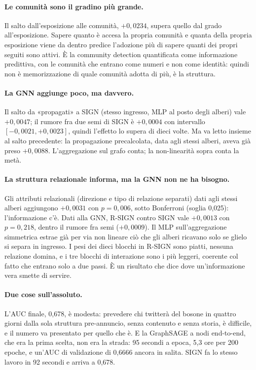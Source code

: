 \documentclass[11pt,a4paper]{article}
\begin{document}
\paragraph{Le comunità sono il gradino più grande.} Il salto dall'esposizione alle comunità, $+0{,}0234$, supera quello dal grado all'esposizione. Sapere quanto è accesa la propria comunità e quanta della propria esposizione viene da dentro predice l'adozione più di sapere quanti dei propri seguiti sono attivi. È la community detection quantificata come informazione predittiva, con le comunità che entrano come numeri e non come identità: quindi non è memorizzazione di quale comunità adotta di più, è la struttura.

\paragraph{La GNN aggiunge poco, ma davvero.} Il salto da «propagati» a SIGN (stesso ingresso, MLP al posto degli alberi) vale $+0{,}0047$; il rumore fra due semi di SIGN è $+0{,}0004$ con intervallo $[-0{,}0021, +0{,}0023]$, quindi l'effetto lo supera di dieci volte. Ma va letto insieme al salto precedente: la propagazione precalcolata, data agli stessi alberi, aveva già preso $+0{,}0088$. L'aggregazione sul grafo conta; la non-linearità sopra conta la metà.

\paragraph{La struttura relazionale informa, ma la GNN non ne ha bisogno.} Gli attributi relazionali (direzione e tipo di relazione separati) dati agli stessi alberi aggiungono $+0{,}0031$ con $p = 0{,}006$, sotto Bonferroni (soglia 0,025): l'informazione c'è. Dati alla GNN, R-SIGN contro SIGN vale $+0{,}0013$ con $p = 0{,}218$, dentro il rumore fra semi ($+0{,}0009$). Il MLP sull'aggregazione simmetrica estrae già per via non lineare ciò che gli alberi ricavano solo se glielo si separa in ingresso. I pesi dei dieci blocchi in R-SIGN sono piatti, nessuna relazione domina, e i tre blocchi di interazione sono i più leggeri, coerente col fatto che entrano solo a due passi. È un risultato che dice dove un'informazione vera smette di servire.

\paragraph{Due cose sull'assoluto.} L'AUC finale, 0,678, è modesta: prevedere chi twitterà del bosone in quattro giorni dalla sola struttura pre-annuncio, senza contenuto e senza storia, è difficile, e il numero va presentato per quello che è. E la GraphSAGE a nodi end-to-end, che era la prima scelta, non era la strada: 95 secondi a epoca, 5,3 ore per 200 epoche, e un'AUC di validazione di 0,6666 ancora in salita. SIGN fa lo stesso lavoro in 92 secondi e arriva a 0,678.
\end{document}
